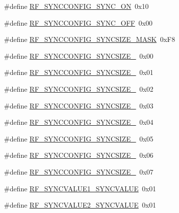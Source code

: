 \begin{DoxyCompactItemize}
\item 
\#define \mbox{\hyperlink{sx1276_regs-_fsk_8h_a7ccce52a152f24047a49b53f9238ce57}{R\+F\+\_\+\+S\+Y\+N\+C\+C\+O\+N\+F\+I\+G\+\_\+\+S\+Y\+N\+C\+\_\+\+ON}}~0x10
\item 
\#define \mbox{\hyperlink{sx1276_regs-_fsk_8h_a09a78683bc189b8a3c47ec3aee9bd562}{R\+F\+\_\+\+S\+Y\+N\+C\+C\+O\+N\+F\+I\+G\+\_\+\+S\+Y\+N\+C\+\_\+\+O\+FF}}~0x00
\item 
\#define \mbox{\hyperlink{sx1276_regs-_fsk_8h_a470d9a45389bc8f22f4eee11937274fc}{R\+F\+\_\+\+S\+Y\+N\+C\+C\+O\+N\+F\+I\+G\+\_\+\+S\+Y\+N\+C\+S\+I\+Z\+E\+\_\+\+M\+A\+SK}}~0x\+F8
\item 
\#define \mbox{\hyperlink{sx1276_regs-_fsk_8h_ac7cf5fb2ab72c6b637f27980a77d49b3}{R\+F\+\_\+\+S\+Y\+N\+C\+C\+O\+N\+F\+I\+G\+\_\+\+S\+Y\+N\+C\+S\+I\+Z\+E\+\_}}~0x00
\item 
\#define \mbox{\hyperlink{sx1276_regs-_fsk_8h_ab3cee473593e065fb7bb4121dba8dfc8}{R\+F\+\_\+\+S\+Y\+N\+C\+C\+O\+N\+F\+I\+G\+\_\+\+S\+Y\+N\+C\+S\+I\+Z\+E\+\_}}~0x01
\item 
\#define \mbox{\hyperlink{sx1276_regs-_fsk_8h_a0b7febf6601e6e048eadfea72756fbf5}{R\+F\+\_\+\+S\+Y\+N\+C\+C\+O\+N\+F\+I\+G\+\_\+\+S\+Y\+N\+C\+S\+I\+Z\+E\+\_}}~0x02
\item 
\#define \mbox{\hyperlink{sx1276_regs-_fsk_8h_a3e690add68a9524bb58f47842e68d83c}{R\+F\+\_\+\+S\+Y\+N\+C\+C\+O\+N\+F\+I\+G\+\_\+\+S\+Y\+N\+C\+S\+I\+Z\+E\+\_}}~0x03
\item 
\#define \mbox{\hyperlink{sx1276_regs-_fsk_8h_a604cc721857bae9b870b53048ecf341b}{R\+F\+\_\+\+S\+Y\+N\+C\+C\+O\+N\+F\+I\+G\+\_\+\+S\+Y\+N\+C\+S\+I\+Z\+E\+\_}}~0x04
\item 
\#define \mbox{\hyperlink{sx1276_regs-_fsk_8h_aff9f3662ee515712447db47565a8f7dc}{R\+F\+\_\+\+S\+Y\+N\+C\+C\+O\+N\+F\+I\+G\+\_\+\+S\+Y\+N\+C\+S\+I\+Z\+E\+\_}}~0x05
\item 
\#define \mbox{\hyperlink{sx1276_regs-_fsk_8h_a9d9db7e70160e306d46e9a3fb119497d}{R\+F\+\_\+\+S\+Y\+N\+C\+C\+O\+N\+F\+I\+G\+\_\+\+S\+Y\+N\+C\+S\+I\+Z\+E\+\_}}~0x06
\item 
\#define \mbox{\hyperlink{sx1276_regs-_fsk_8h_a3ad4c813c0827a01d61620f16a8e6867}{R\+F\+\_\+\+S\+Y\+N\+C\+C\+O\+N\+F\+I\+G\+\_\+\+S\+Y\+N\+C\+S\+I\+Z\+E\+\_}}~0x07
\item 
\#define \mbox{\hyperlink{sx1276_regs-_fsk_8h_a9dbf8a5e894ab724bb15b1721e218127}{R\+F\+\_\+\+S\+Y\+N\+C\+V\+A\+L\+U\+E1\+\_\+\+S\+Y\+N\+C\+V\+A\+L\+UE}}~0x01
\item 
\#define \mbox{\hyperlink{sx1276_regs-_fsk_8h_ab6518f99eb4a677a3fe535db8d48c732}{R\+F\+\_\+\+S\+Y\+N\+C\+V\+A\+L\+U\+E2\+\_\+\+S\+Y\+N\+C\+V\+A\+L\+UE}}~0x01

\end{DoxyCompactItemize}

